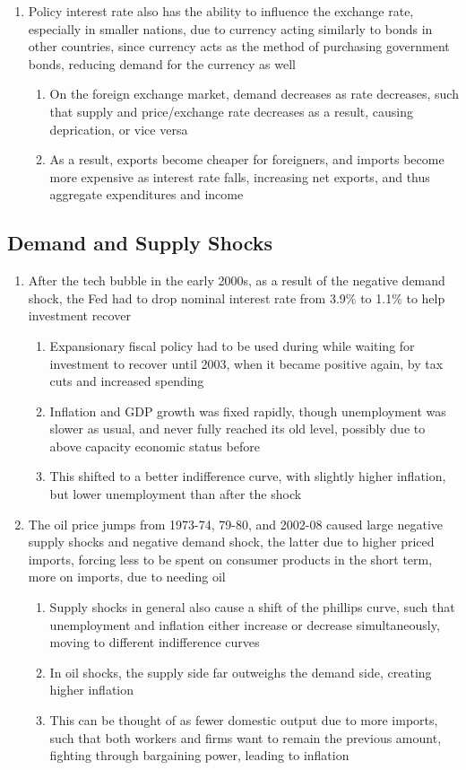 \begin{enumerate}
\item Policy interest rate also has the ability to influence the exchange rate, especially in smaller nations, due to currency acting similarly to bonds in other countries, since currency acts as the method of purchasing government bonds, reducing demand for the currency as well
\begin{enumerate}
\item On the foreign exchange market, demand decreases as rate decreases, such that supply and price/exchange rate decreases as a result, causing deprication, or vice versa
\item As a result, exports become cheaper for foreigners, and imports become more expensive as interest rate falls, increasing net exports, and thus aggregate expenditures and income
\end{enumerate}
\end{enumerate}

\subsection{Demand and Supply Shocks}
\begin{enumerate}
\item After the tech bubble in the early 2000s, as a result of the negative demand shock, the Fed had to drop nominal interest rate from 3.9\% to 1.1\% to help investment recover
\begin{enumerate}
\item Expansionary fiscal policy had to be used during while waiting for investment to recover until 2003, when it became positive again, by tax cuts and increased spending
\item Inflation and GDP growth was fixed rapidly, though unemployment was slower as usual, and never fully reached its old level, possibly due to above capacity economic status before
\item This shifted to a better indifference curve, with slightly higher inflation, but lower unemployment than after the shock
\end{enumerate}
\item The oil price jumps from 1973-74, 79-80, and 2002-08 caused large negative supply shocks and negative demand shock, the latter due to higher priced imports, forcing less to be spent on consumer products in the short term, more on imports, due to needing oil
\begin{enumerate}
\item Supply shocks in general also cause a shift of the phillips curve, such that unemployment and inflation either increase or decrease simultaneously, moving to different indifference curves
\item In oil shocks, the supply side far outweighs the demand side, creating higher inflation
\item This can be thought of as fewer domestic output due to more imports, such that both workers and firms want to remain the previous amount, fighting through bargaining power, leading to inflation 
\end{enumerate}
\end{enumerate}

